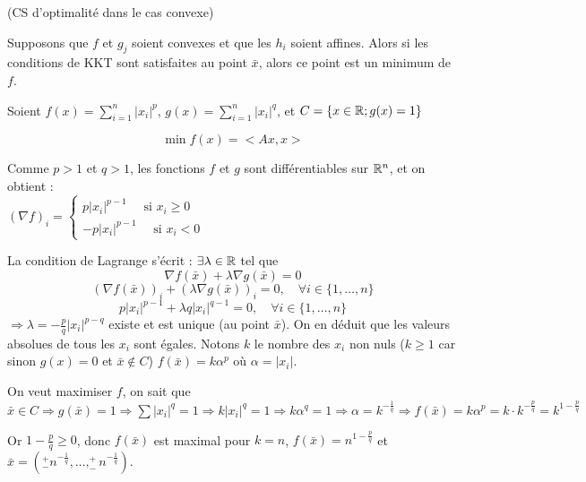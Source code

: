 \begin{theoreme} (CS d'optimalité dans le cas convexe)

Supposons que $f$ et $g_j$ soient convexes et que les $h_i$ soient affines. Alors si les conditions de KKT sont satisfaites au point $\bar{x}$, alors ce point est un minimum de $f$.
\end{theoreme}
\begin{exemple} %

	Soient $ \displaystyle f(x) = \sum_{i=1}^n |x_i|^p $, 
	$ \displaystyle g(x) = \sum_{i=1}^n |x_i|^q $, et
	$ \displaystyle C = \{ x \in \mathbb{R} ; g(x) = 1 \} $
	
	\[ \min f(x)=<Ax,x> \]
	
	Comme $p>1$ et $q>1$, les fonctions $f$ et $g$ sont différentiables sur $\mathbb{R}^n$, et on obtient :\\ $\displaystyle (\nabla f)_i = \begin{cases} p |x_i|^{p-1} \quad \text{ si }x_i\geq 0 \\  -p |x_i|^{p-1} \quad \text{ si } x_i < 0  \end{cases}$ 
	
	La condition de Lagrange s'écrit : $\exists \lambda \in \mathbb{R}$ tel que 
	\[ \nabla f(\bar{x}) + \lambda \nabla g(\bar{x}) = 0 \]
	\[ (\nabla f(\bar{x}))_i + (\lambda \nabla g(\bar{x}))_i = 0 , \quad \forall i \in \{ 1, \dots, n \} \]
	\[ p|x_i|^{p-1} + \lambda q|x_i|^{q-1} = 0 , \quad \forall i \in \{ 1, \dots, n \} \]
	$ \Rightarrow \lambda = - \frac{p}{q}|x_i|^{p-q} $ existe et est unique (au point $\bar{x}$). On en déduit que les valeurs absolues de tous les $x_i$ sont égales.
	Notons $k$ le nombre des $x_i$ non nuls ($k \geq 1$ car sinon $g(x) = 0$ et $\bar{x} \not \in C$)
	$f(\bar{x}) = k \alpha ^p$ où $\alpha = |x_i|$.
	
	On veut maximiser $f$, on sait que $\bar{x} \in C \Rightarrow g(\bar{x}) = 1 \Rightarrow \sum |x_i|^q = 1 \Rightarrow k |x_i|^q = 1 \Rightarrow k \alpha^q = 1 \Rightarrow \alpha = k^{-\frac{1}{q}} \Rightarrow f(\bar{x}) = k \alpha^p = k \cdot k^{-\frac{p}{q}} = k^{1-\frac{p}{q}} $
	
	Or $1-\frac{p}{q} \geq 0$, donc $f(\bar{x})$ est maximal pour $k=n$, $f(\bar{x}) = n^{1-\frac{p}{q}}$ et $\bar{x} = (^+_- n^{-\frac{1}{q}}, \dots, ^+_- n^{-\frac{1}{q}})$.
	
\end{exemple}

